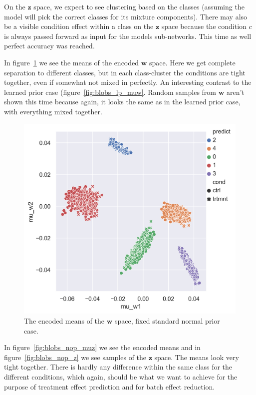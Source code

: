 \documentclass[11pt, a4paper]{report}
\theoremstyle{plain}
\theoremstyle{definition}
\theoremstyle{remark}
\newcommand{\z}{\mathbf{z}}
\newcommand{\w}{\mathbf{w}}
\begin{document}
On the $\z$ space, we expect to see clustering based on the classes (assuming
the model will pick the correct classes for its mixture components).
There may also be a visible condition effect within a class on the $\z$ space
because the condition $c$ is always passed forward as input for the models
sub-networks.
This time as well perfect accuracy was reached.

In figure~\ref{fig:blobs_nop_muw} we see the means of the encoded $\w$ space.
Here we get complete separation to different classes, but in each class-cluster
the conditions are tight together, even if somewhat not mixed in perfectly.
An interesting contrast to the learned prior case
(figure~\ref{fig:blobs_lp_muw}.
Random samples from $\w$ aren't shown this time because again, it looks the same 
as in the learned prior case, with everything mixed together.

\begin{figure}[h]
\centering
\includegraphics[width=1.1\textwidth]{images/blobs_cgmvae_stdprior_mu_w.png}
\caption{The encoded means of the $\w$ space, fixed standard normal prior case.
}
\label{fig:blobs_nop_muw}
\end{figure}

In figure~\ref{fig:blobs_nop_muz} we see the encoded means and in
figure~\ref{fig:blobs_nop_z} we see samples of the $\z$ space. The means look
very tight together. There is hardly any difference within  the same class for
the different conditions, which again, should be what we want to achieve for the
purpose of treatment effect prediction and for batch effect reduction.
\end{document}
